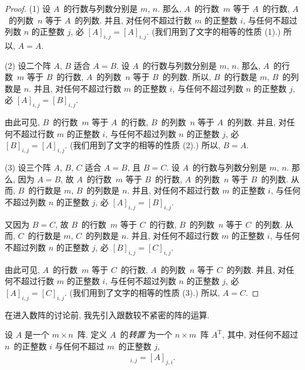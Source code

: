 \begin{proof}
    (1)
    设 \(A\)~的行数与列数分别是 \(m\), \(n\).
    那么,
    \(A\)~的行数~\(m\) 等于 \(A\)~的行数,
    \(A\)~的列数~\(n\) 等于 \(A\)~的列数.
    并且, 对任何不超过行数 \(m\) 的正整数 \(i\),
    与任何不超过列数 \(n\) 的正整数 \(j\),
    必 \([A]_{i,j} = [A]_{i,j}\).
    (我们用到了文字的相等的性质 (1).)
    所以, \(A = A\).

    (2)
    设二个阵 \(A\), \(B\) 适合 \(A = B\).
    设 \(A\)~的行数与列数分别是 \(m\), \(n\).
    那么,
    \(A\)~的行数~\(m\) 等于 \(B\)~的行数,
    \(A\)~的列数~\(n\) 等于 \(B\)~的列数.
    所以, \(B\)~的行数是 \(m\), \(B\)~的列数是 \(n\).
    并且, 对任何不超过行数 \(m\) 的正整数 \(i\),
    与任何不超过列数 \(n\) 的正整数 \(j\),
    必 \([A]_{i,j} = [B]_{i,j}\).

    由此可见,
    \(B\)~的行数~\(m\) 等于 \(A\)~的行数,
    \(B\)~的列数~\(n\) 等于 \(A\)~的列数.
    并且, 对任何不超过行数 \(m\) 的正整数 \(i\),
    与任何不超过列数 \(n\) 的正整数 \(j\),
    必 \([B]_{i,j} = [A]_{i,j}\).
    (我们用到了文字的相等的性质 (2).)
    所以, \(B = A\).

    (3)
    设三个阵 \(A\), \(B\), \(C\) 适合 \(A = B\), 且 \(B = C\).
    设 \(A\)~的行数与列数分别是 \(m\), \(n\).
    那么, 因为 \(A = B\),
    故
    \(A\)~的行数~\(m\) 等于 \(B\)~的行数,
    \(A\)~的列数~\(n\) 等于 \(B\)~的列数.
    从而,
    \(B\)~的行数是 \(m\), \(B\)~的列数是 \(n\).
    并且, 对任何不超过行数 \(m\) 的正整数 \(i\),
    与任何不超过列数 \(n\) 的正整数 \(j\),
    必 \([A]_{i,j} = [B]_{i,j}\).

    又因为 \(B = C\),
    故
    \(B\)~的行数~\(m\) 等于 \(C\)~的行数,
    \(B\)~的列数~\(n\) 等于 \(C\)~的列数.
    从而,
    \(C\)~的行数是 \(m\), \(C\)~的列数是 \(n\).
    并且, 对任何不超过行数 \(m\) 的正整数 \(i\),
    与任何不超过列数 \(n\) 的正整数 \(j\),
    必 \([B]_{i,j} = [C]_{i,j}\).

    由此可见,
    \(A\)~的行数~\(m\) 等于 \(C\)~的行数,
    \(A\)~的列数~\(n\) 等于 \(C\)~的列数.
    并且, 对任何不超过行数 \(m\) 的正整数 \(i\),
    与任何不超过列数 \(n\) 的正整数 \(j\),
    必 \([A]_{i,j} = [C]_{i,j}\).
    (我们用到了文字的相等的性质 (3).)
    所以, \(A = C\).
\end{proof}

在进入数阵的讨论前,
我先引入跟数较不紧密的阵的运算.

\begin{definition}[转置]
    设 \(A\) 是一个 \(m \times n\)~阵.
    定义 \(A\)~的\emph{转置}%
    为一个 \(n \times m\)~阵 \(A^{\mathrm{T}}\),
    其中, 对任何不超过 \(n\)~的正整数 \(i\)
    与任何不超过 \(m\)~的正整数 \(j\),
    \begin{align*}
        [A^{\mathrm{T}}]_{i,j} = [A]_{j,i}.
    \end{align*}
\end{definition}

